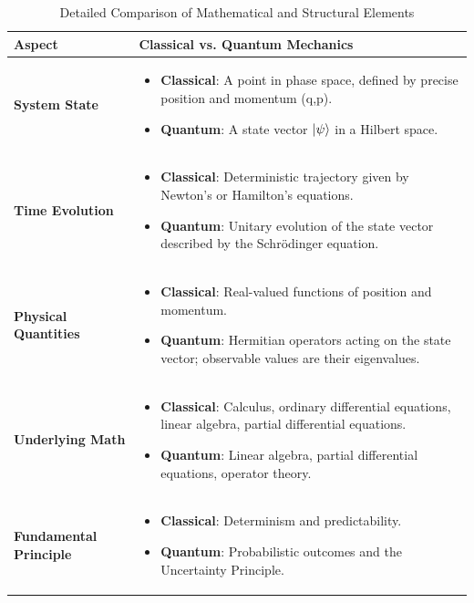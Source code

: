 \documentclass{article}
\begin{document}
\begin{table}[!h]
\centering
\caption{Detailed Comparison of Mathematical and Structural Elements}
\label{tab:detailed_comparison}
\begin{tabular}{p{} p{}}
\toprule
\textbf{Aspect} & \textbf{Classical vs. Quantum Mechanics} \\
\midrule
\textbf{System State} & \begin{itemize}
\item \textbf{Classical}: A point in phase space, defined by precise position and momentum (q,p).
\item \textbf{Quantum}: A state vector $\ket{\psi}$ in a Hilbert space.
\end{itemize} \\
\textbf{Time Evolution} & \begin{itemize}
\item \textbf{Classical}: Deterministic trajectory given by Newton's or Hamilton's equations.
\item \textbf{Quantum}: Unitary evolution of the state vector described by the Schrödinger equation.
\end{itemize} \\
\textbf{Physical Quantities} & \begin{itemize}
\item \textbf{Classical}: Real-valued functions of position and momentum.
\item \textbf{Quantum}: Hermitian operators acting on the state vector; observable values are their eigenvalues.
\end{itemize} \\
\textbf{Underlying Math} & \begin{itemize}
\item \textbf{Classical}: Calculus, ordinary differential equations, linear algebra, partial differential equations.
\item \textbf{Quantum}: Linear algebra, partial differential equations, operator theory.
\end{itemize} \\
\textbf{Fundamental Principle} & \begin{itemize}
\item \textbf{Classical}: Determinism and predictability.
\item \textbf{Quantum}: Probabilistic outcomes and the Uncertainty Principle.
\end{itemize} \\
\bottomrule
\end{tabular}
\end{table}
\newpage
\end{document}
